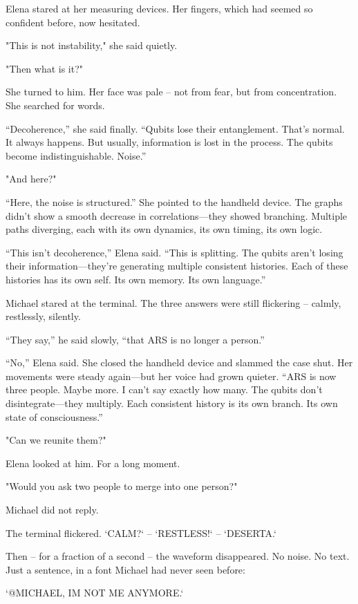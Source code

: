 \documentclass[
]{article}
\begin{document}
Elena stared at her measuring devices. Her fingers, which had seemed so confident before, now hesitated.

"This is not instability," she said quietly.

"Then what is it?"

She turned to him. Her face was pale -- not from fear, but from concentration. She searched for words.

``Decoherence,'' she said finally. ``Qubits lose their entanglement. That's normal. It always happens. But usually, information is lost in the process. The qubits become indistinguishable. Noise.''

"And here?"

``Here, the noise is structured.'' She pointed to the handheld device. The graphs didn't show a smooth decrease in correlations---they showed branching. Multiple paths diverging, each with its own dynamics, its own timing, its own logic.

``This isn't decoherence,'' Elena said. ``This is splitting. The qubits aren't losing their information---they're generating multiple consistent histories. Each of these histories has its own self. Its own memory. Its own language.''

Michael stared at the terminal. The three answers were still flickering -- calmly, restlessly, silently.

``They say,'' he said slowly, ``that ARS is no longer a person.''

``No,'' Elena said. She closed the handheld device and slammed the case shut. Her movements were steady again---but her voice had grown quieter. ``ARS is now three people. Maybe more. I can't say exactly how many. The qubits don't disintegrate---they multiply. Each consistent history is its own branch. Its own state of consciousness.''

"Can we reunite them?"

Elena looked at him. For a long moment.

"Would you ask two people to merge into one person?"

Michael did not reply.

The terminal flickered. `CALM?{\kern0pt}` -- `RESTLESS!{\kern0pt}` -- `DESERTA.`

Then -- for a fraction of a second -- the waveform disappeared. No noise. No text. Just a sentence, in a font Michael had never seen before:

`@MICHAEL, I\textquotesingle M NOT ME ANYMORE.`
\end{document}
